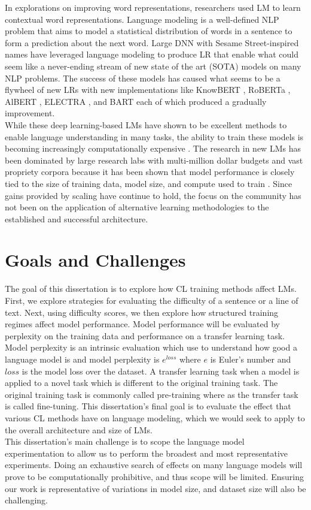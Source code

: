 In explorations on improving word representations, researchers used LM to learn contextual word representations. Language modeling is a well-defined NLP problem that aims to model a statistical distribution of words in a sentence to form a prediction about the next word. Large DNN with Sesame Street-inspired names \cite{Peters2019KnowledgeEC} \cite{Devlin2019BERTPO} \cite{Sun2019ERNIEER} have leveraged language modeling to produce LR that enable what could seem like a never-ending stream of new state of the art (SOTA) models on many NLP problems. The success of these models has caused what seems to be a flywheel of new LRs with new implementations like KnowBERT \cite{Peters2019KnowledgeEC}, RoBERTa \cite{Liu2019RoBERTaAR}, AlBERT \cite{Lan2019ALBERTAL}, ELECTRA \cite{Clark2020ELECTRAPT}, and BART \cite{Lewis2019BARTDS} each of which produced a gradually improvement. \\
While these deep learning-based LMs have shown to be excellent methods to enable language understanding in many tasks, the ability to train these models is becoming increasingly computationally expensive \cite{Strubell2019EnergyAP}. The research in new LMs has been dominated by large research labs with multi-million dollar budgets and vast propriety corpora because it has been shown that model performance is closely tied to the size of training data, model size, and compute used to train \cite{Kaplan2020ScalingLF}. Since gains provided by scaling have continue to hold, the focus on the community has not been on the application of alternative learning methodologies to the established and successful architecture.
\section {Goals and Challenges}
\label{chap:intro:sec:goals}
The goal of this dissertation is to explore how CL training methods affect LMs. First, we explore strategies for evaluating the difficulty of a sentence or a line of text. Next, using difficulty scores, we then explore how structured training regimes affect model performance. Model performance will be evaluated by perplexity on the training data and performance on a transfer learning task. Model perplexity is an intrinsic evaluation which use to understand how good a language model is and model perplexity is $e^{loss}$ where $e$ is Euler's number and $loss$ is the model loss over the dataset. A transfer learning task when a model is applied to a novel task which is different to the original training task. The original training task is commonly called pre-training where as the transfer task is called fine-tuning. This dissertation's final goal is to evaluate the effect that various CL methods have on language modeling, which we would seek to apply to the overall architecture and size of LMs. \\
This dissertation's main challenge is to scope the language model experimentation to allow us to perform the broadest and most representative experiments. Doing an exhaustive search of effects on many language models will prove to be computationally prohibitive, and thus scope will be limited. Ensuring our work is representative of variations in model size, and dataset size will also be challenging. 
